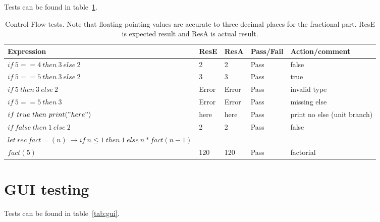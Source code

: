 Tests can be found in table~\ref{tab:control}.

\begin{table}[h]
    \caption{Control Flow tests. Note that floating pointing values are accurate to three decimal places for the fractional part. ResE is expected result and ResA is actual result. \\}
    \begin{tabular}{|p{1.8in}|p{0.5in}|p{0.4in}|p{0.6in}|p{1.4in}|} \hline
    Expression & ResE & ResA& Pass/Fail & Action/comment \\ \hline \hline
    $if\ 5 == 4\ then\ 3\ else\ 2$ & 2 & 2 & Pass & false \\ \hline
    $if\ 5 == 5\ then\ 3\ else\ 2$ & 3 & 3 & Pass & true \\ \hline
    $if\ 5\ then\ 3\ else\ 2$ & Error & Error & Pass & invalid type \\ \hline
    $if\ 5 == 5\ then\ 3$ & Error & Error & Pass & missing else \\ \hline
    $if\ true\ then\ print("here")$ & here & here & Pass & print no else (unit branch) \\ \hline
    $if\ false\ then\ 1\ else\ 2$ & 2 & 2 & Pass & false \\ \hline
    $let\ rec\ fact=(n)\ \rightarrow if\ n \leq 1\ then\ 1\ else\ n * fact(n-1)$ & & & & \\
    $fact(5)$ & 120 & 120 & Pass & factorial \\ \hline
    \end{tabular}
    \label{tab:control}
\end{table}

\section{GUI testing}\label{sec:gui-testing}

Tests can be found in table~\ref{tab:gui}.

